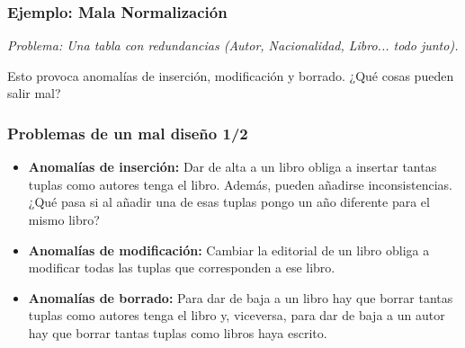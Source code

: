 \documentclass{beamer}
\begin{document}
\begin{frame}
  \frametitle{Ejemplo: Mala Normalización}
  \textit{Problema: Una tabla con redundancias (Autor, Nacionalidad, Libro... todo junto).}
  



\begin{center}
\end{center}
  
  \vspace{0.5em}
  Esto provoca anomalías de inserción, modificación y borrado. ¿Qué cosas pueden salir mal?
\end{frame}


\begin{frame}
  \frametitle{Problemas de un mal diseño 1/2}
  \begin{itemize}
    \item \textbf{Anomalías de inserción:} Dar de alta a un libro obliga a insertar tantas tuplas como autores tenga el libro. Además, pueden añadirse inconsistencias. ¿Qué pasa si al añadir una de esas tuplas pongo un año diferente para el mismo libro?
    \item \textbf{Anomalías de modificación:} Cambiar la editorial de un libro obliga a modificar todas las tuplas que corresponden a ese libro.
    \item \textbf{Anomalías de borrado:} Para dar de baja a un libro hay que borrar tantas tuplas como autores tenga el libro y, viceversa, para dar de baja a un autor hay que borrar tantas tuplas como libros haya escrito.
  \end{itemize}
\end{frame}
\end{document}
